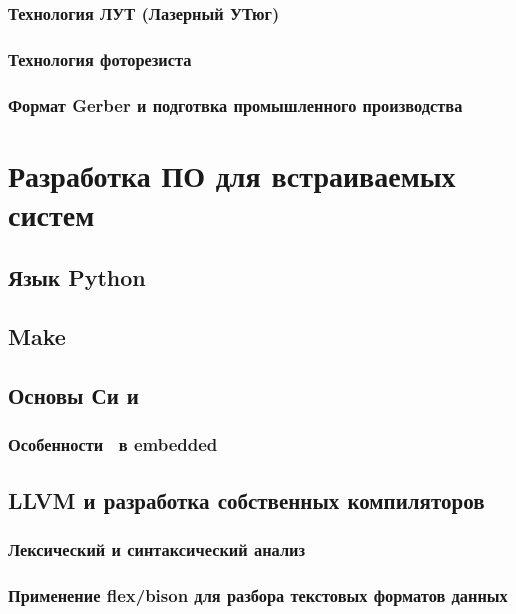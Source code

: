 \section{Технология ЛУТ (Лазерный УТюг)}

\section{Технология фоторезиста}

\section{Формат Gerber и подготвка промышленного производства}

\part{Разработка ПО для встраиваемых систем}

\chapter{Язык Python}

\chapter{Make}

\chapter{Основы Си и \cpp}

\section{Особенности \cpp\ в embedded}

\chapter{LLVM и разработка собственных компиляторов}

\section{Лексический и синтаксический анализ}

\section{Применение flex/bison для разбора текстовых форматов данных}

